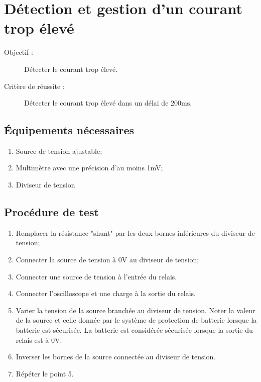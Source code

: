 
\section{Détection et gestion d'un courant trop élevé}

\begin{description}
	\item[Objectif :] Détecter le courant trop élevé.
	\item[Critère de réussite :] Détecter le courant trop élevé dans un délai de $200\text{ms}$.
\end{description}

\subsection*{Équipements nécessaires}
\begin{enumerate}
	\item Source de tension ajustable;
	\item Multimètre avec une précision d'au moins 1mV;
	\item Diviseur de tension
\end{enumerate}	

\subsection*{Procédure de test}
\begin{enumerate}
	\item Remplacer la résistance "shunt" par les deux bornes inférieures du diviseur de tension; 
	\item Connecter la source de tension à 0V au diviseur de tension;
	\item Connecter une source de tension à l'entrée du relais.
	\item Connecter l'oscilloscope et une charge à la sortie du relais.
	\item Varier la tension de la source branchée au diviseur de tension. Noter la valeur de la source et celle donnée par le système de protection de batterie lorsque la batterie est sécurisée. La batterie est considérée sécurisée lorsque la sortie du relais est à 0V.
	\item Inverser les bornes de la source connectée au diviseur de tension.
	\item Répéter le point 5.
\end{enumerate}